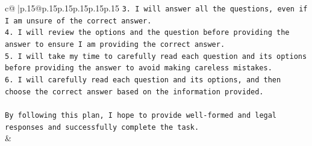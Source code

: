 \documentclass{article}
\begin{document}
{\begin{supertabular}{c@{$\;$}|p{.15\linewidth}@{}p{.15\linewidth}p{.15\linewidth}p{.15\linewidth}p{.15\linewidth}p{.15\linewidth}}
{{{\texttt{3. I will answer all the questions, even if I am unsure of the correct answer.} \\
\texttt{4. I will review the options and the question before providing the answer to ensure I am providing the correct answer.} \\
\texttt{5. I will take my time to carefully read each question and its options before providing the answer to avoid making careless mistakes.} \\
\texttt{6. I will carefully read each question and its options, and then choose the correct answer based on the information provided.} \\
\\ 
\texttt{By following this plan, I hope to provide well{-}formed and legal responses and successfully complete the task.} \\
            }
        }
    }
    & \\ \\

\end{supertabular}
}
\end{document}
